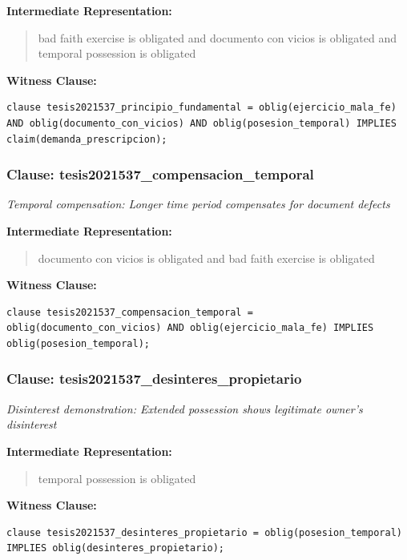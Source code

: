 \documentclass[11pt,a4paper]{article}
\begin{document}
\textbf{Intermediate Representation:}

\begin{quote}
bad faith exercise is obligated and documento con vicios is obligated and temporal possession is obligated
\end{quote}

\textbf{Witness Clause:}

\begin{lstlisting}[style=witnessstyle, language=Witness]
clause tesis2021537_principio_fundamental = oblig(ejercicio_mala_fe) AND oblig(documento_con_vicios) AND oblig(posesion_temporal) IMPLIES claim(demanda_prescripcion);
\end{lstlisting}

\subsubsection{Clause: tesis2021537\_compensacion\_temporal}

\textit{Temporal compensation: Longer time period compensates for document defects}

\textbf{Intermediate Representation:}

\begin{quote}
documento con vicios is obligated and bad faith exercise is obligated
\end{quote}

\textbf{Witness Clause:}

\begin{lstlisting}[style=witnessstyle, language=Witness]
clause tesis2021537_compensacion_temporal = oblig(documento_con_vicios) AND oblig(ejercicio_mala_fe) IMPLIES oblig(posesion_temporal);
\end{lstlisting}

\subsubsection{Clause: tesis2021537\_desinteres\_propietario}

\textit{Disinterest demonstration: Extended possession shows legitimate owner's disinterest}

\textbf{Intermediate Representation:}

\begin{quote}
temporal possession is obligated
\end{quote}

\textbf{Witness Clause:}

\begin{lstlisting}[style=witnessstyle, language=Witness]
clause tesis2021537_desinteres_propietario = oblig(posesion_temporal) IMPLIES oblig(desinteres_propietario);
\end{lstlisting}
\end{document}
